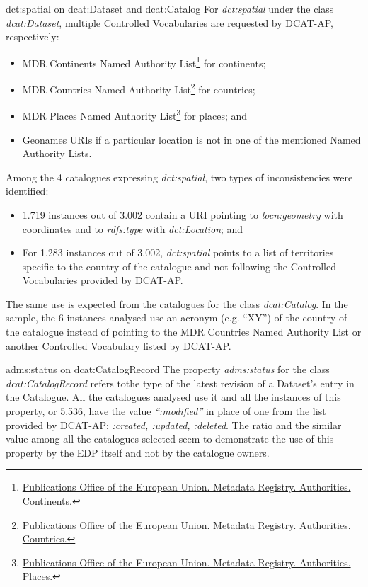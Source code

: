 \documentclass[<options>]{elsarticle}
\begin{document}
dct:spatial on dcat:Dataset and dcat:Catalog
For \textit{dct:spatial} under the class \textit{dcat:Dataset}, multiple Controlled Vocabularies are requested by DCAT-AP, respectively:
\begin{itemize}
\item MDR Continents Named Authority List\footnote{\href{http://publications.europa.eu/mdr/authority/continent/
}{Publications Office of the European Union. Metadata Registry. Authorities. Continents.}} for continents;
\item MDR Countries Named Authority List\footnote{\href{http://publications.europa.eu/mdr/authority/country/}{Publications Office of the European Union. Metadata Registry. Authorities. Countries.}} for countries;
\item MDR Places Named Authority List\footnote{\href{    http://publications.europa.eu/mdr/authority/place/}{Publications Office of the European Union. Metadata Registry. Authorities. Places.}} for places; and
\item Geonames URIs if a particular location is not in one of the mentioned Named Authority Lists.
\end{itemize}

Among the 4 catalogues expressing \textit{dct:spatial}, two types of inconsistencies were identified:
\begin{itemize}
\item 1.719 instances out of 3.002 contain a URI pointing to \textit{locn:geometry} with coordinates and to \textit{rdfs:type} with \textit{dct:Location}; and
\item For 1.283 instances out of 3.002, \textit{dct:spatial} points to a list of territories specific to the country of the catalogue and not following the Controlled Vocabularies provided by DCAT-AP.
\end{itemize}

The same use is expected from the catalogues for the class \textit{dcat:Catalog}. In the sample, the 6 instances analysed use an acronym (e.g. “XY”) of the country of the catalogue instead of pointing to the MDR Countries Named Authority List or another Controlled Vocabulary listed by DCAT-AP.

adms:status on dcat:CatalogRecord
The property \textit{adms:status }for the class \textit{dcat:CatalogRecord} refers tothe type of the latest revision of a Dataset's entry in the Catalogue. All the catalogues analysed use it and all the instances of this property, or 5.536, have the value \textit{“:modified”} in place of one from the list provided by DCAT-AP: \textit{:created, :updated, :deleted}. The ratio and the similar value among all the catalogues selected seem to demonstrate the use of this property by the EDP itself and not by the catalogue owners.
\end{document}
